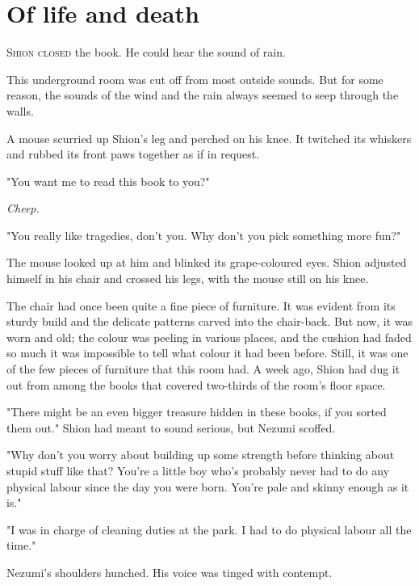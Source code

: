 
\chapter{Of life and death}


\lettrine{S}{hion closed} the book. He could hear the sound of rain.

This underground room was cut off from most outside sounds. But for some
reason, the sounds of the wind and the rain always seemed to seep
through the walls.

A mouse scurried up Shion's leg and perched on his knee. It twitched its
whiskers and rubbed its front paws together as if in request.

"You want me to read this book to you?"

\emph{Cheep.}

"You really like tragedies, don't you. Why don't you pick something more
fun?"

The mouse looked up at him and blinked its grape-coloured eyes. Shion
adjusted himself in his chair and crossed his legs, with the mouse still
on his knee.

The chair had once been quite a fine piece of furniture. It was evident
from its sturdy build and the delicate patterns carved into the
chair-back. But now, it was worn and old; the colour was peeling in
various places, and the cushion had faded so much it was impossible to
tell what colour it had been before. Still, it was one of the few pieces
of furniture that this room had. A week ago, Shion had dug it out from
among the books that covered two-thirds of the room's floor space.

"There might be an even bigger treasure hidden in these books, if you
sorted them out." Shion had meant to sound serious, but Nezumi scoffed.

"Why don't you worry about building up some strength before thinking
about stupid stuff like that? You're a little boy who's probably never
had to do any physical labour since the day you were born. You're pale
and skinny enough as it is."

"I was in charge of cleaning duties at the park. I had to do physical
labour all the time."

Nezumi's shoulders hunched. His voice was tinged with contempt.

